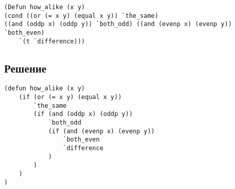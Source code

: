 \begin{code}
\begin{verbatim}
(Defun how_alike (x y)
(cond ((or (= x y) (equal x y)) `the_same)
((and (oddp x) (oddp y)) `both_odd) ((and (evenp x) (evenp y)) `both_even)
	`(t `difference)))
\end{verbatim}
\end{code}

\subsection*{Решение}
\begin{code}
\begin{verbatim}
(defun how_alike (x y)
	(if (or (= x y) (equal x y))
		`the_same
		(if (and (oddp x) (oddp y))
			`both_odd
			(if (and (evenp x) (evenp y))
				`both_even
				`difference
			)
		)
	)
)
\end{verbatim}
\end{code}


\newpage